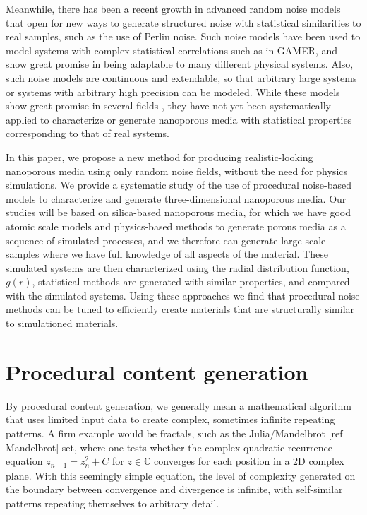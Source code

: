 \documentclass[aps,pre,twocolumn,letterpaper,floatfix,showpacs]{revtex4}
\begin{document}
Meanwhile, there has been a recent growth in advanced random noise models that open for new
ways to generate structured noise with statistical similarities to real samples, such as the use of Perlin noise. 
Such noise models have been used to model systems with complex statistical correlations such
as in GAMER\cite{groeneboom:2014}, and show great promise in being adaptable to many different physical systems. 
Also, such noise models are continuous and extendable, so that arbitrary large systems or
systems with arbitrary high precision can be modeled. 
While these models show great promise in several fields \cite{ebert2003texturing, cook2005wavelet, bridson2007curl, goldberg2008anisotropic},
they have not yet been systematically applied to characterize or generate nanoporous media with statistical properties corresponding to that of real systems.

In this paper, we propose a new method for producing realistic-looking nanoporous media
using only random noise fields, without the need for physics simulations. 
We provide a systematic study of the use of procedural noise-based models to characterize
and generate three-dimensional nanoporous media. 
Our studies will be based on silica-based nanoporous media, for which we have good atomic
scale models and physics-based methods to generate porous media as a sequence of simulated
processes, and we therefore can generate large-scale samples where we have full knowledge of all aspects of the material. 
These simulated systems are then characterized using the radial distribution function, $g(r)$,
statistical methods are generated with similar properties, and compared with the simulated systems. 
Using these approaches we find that procedural noise methods can be tuned to efficiently create
materials that are structurally similar to simulationed materials. 

\section{Procedural content generation}
By procedural content generation, we generally mean a mathematical algorithm that uses limited
input data to create complex, sometimes infinite repeating patterns.
A firm example would be fractals, such as the Julia/Mandelbrot [ref Mandelbrot] set, where one
tests whether the complex quadratic recurrence equation $z_{n+1} = z_n^2 +C$ for $z \in \mathbb C$
converges for each position in a 2D complex plane.
With this seemingly simple equation, the level of complexity generated on the boundary between
convergence and divergence is infinite, with self-similar patterns repeating themselves to arbitrary detail.
\end{document}
